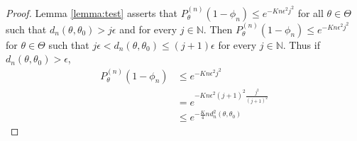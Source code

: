\documentclass[11pt]{article}
\theoremstyle{plain}
\theoremstyle{definition}
\theoremstyle{remark}
\begin{document}
\begin{proof}
    Lemma \ref{lemma:test} asserts that $P_{\theta}^{(n)} (1-\phi_n) \leq e^{-K n \epsilon^2 j^2}$ for all $\theta \in \Theta$ such that $d_n(\theta,\theta_0) > j \epsilon$ and for every $j \in \mathbb N$.
    Then $P_{\theta}^{(n)} (1-\phi_n) \leq e^{-K n \epsilon^2 j^2}$ for $\theta \in \Theta$ such that $ j \epsilon< d_n(\theta,\theta_0) \leq (j+1) \epsilon $ for every $j \in \mathbb N$.
    Thus if $d_n(\theta,\theta_0)>\epsilon$,
    \begin{align*}
        P_{\theta}^{(n)} (1-\phi_n) 
        &\leq e^{-K n \epsilon^2 j^2}
        \\
        &= e^{-K n \epsilon^2 (j+1)^2 \frac{j^2}{(j+1)^2}}
        \\
        &\leq e^{-\frac{K}{4} n d_n^2(\theta,\theta_0) }
    \end{align*}
    
\end{proof}
\end{document}
